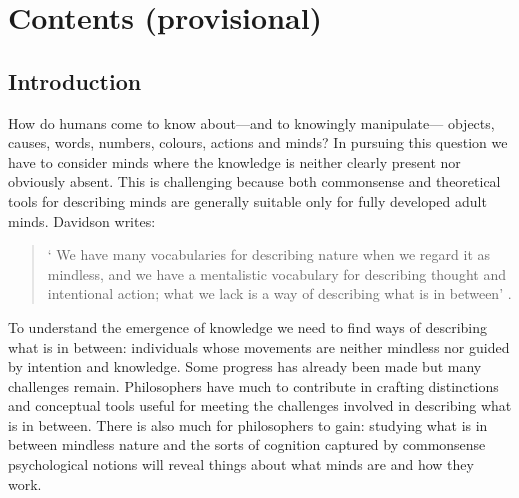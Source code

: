 \documentclass[12pt,\papersize]{extarticle}
\begin{document}
\section{Contents (provisional)}



\subsection{Introduction}
How do humans come to know  about---and to knowingly manipulate---%
objects,
causes,
words,
numbers,
colours,
actions
and
minds?
In pursuing this question we have to consider minds where the knowledge is neither clearly present nor obviously absent. 
This is challenging because both commonsense and theoretical tools for describing minds are generally suitable only for fully developed adult minds. 
Davidson writes:
%
\begin{quote}
`%
We have many vocabularies for describing nature when we regard it as mindless, and we have a mentalistic vocabulary for describing thought and intentional action; what we lack is a way of describing what is in between' \citep[p.\ 11]{Davidson:1999ju}.
\end{quote}
%
%
To understand the emergence of knowledge we need to find ways of describing what is in between: individuals whose movements are neither mindless nor guided by intention and knowledge.  
Some progress has already been made but many challenges remain. 
Philosophers have much to contribute in crafting distinctions and conceptual tools useful for meeting the challenges involved in describing what is in between. 
There is also much for philosophers to gain: studying what is in between mindless nature and the sorts of cognition captured by   commonsense psychological notions 
 will reveal things about what minds are and how they work.
\end{document}

